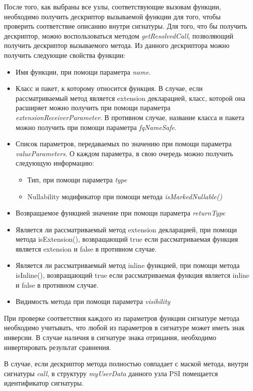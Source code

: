 После того, как выбраны все узлы, соответствующие вызовам функции, необходимо
получить дескриптор вызываемой функции для того, чтобы проверить соответствие  описанию внутри сигнатуры.
Для того, что бы получить дескриптор, можно воспользоваться методом
\textit{getResolvedCall}, позволяющий получить дескриптор вызываемого метода.
Из данного дескриптора можно получить следующие свойства функции:
\begin{itemize}
	\item Имя функции, при помощи параметра \textit{name}.
	\item Класс и пакет, к которому относится функция.
		  	В случае, если рассматриваемый метод является extension декларацией,
		  	класс, которой она расширяет можно получить при помощи параметра
		  	\textit{extensionReceiverParameter}.
		  	В противном случае, название класса и пакета можно получить при помощи параметра \textit{fqNameSafe}.
	\item Список параметров, передаваемых по значению при помощи параметра
		 	  \textit{valueParameters}.
				О каждом параметра, в свою очередь можно получить следующую информацию:
	\begin{itemize}
		\item Тип, при помощи параметра \textit{type}
		\item Nullability модификатор при помощи метода \textit{isMarkedNullable()}
	\end{itemize}
	\item Возвращаемое функцией значение при помощи параметра \textit{returnType}
	\item Является ли рассматриваемый метод extension декларацией, при помощи
				метода isExtension(), возвращающий true если рассматриваемая
				функция является extension и false в противном случае.
	\item Является ли рассматриваемый метод inline функцией, при помощи метода
				isInline(), возвращающий true если рассматриваемая функция
				является inline и false в противном случае.
	\item Видимость метода при помощи параметра \textit{visibility}
\end{itemize}
При проверке соответствия каждого из параметров функции сигнатуре метода необходимо учитывать, что любой из параметров в сигнатуре может иметь знак инверсии.
В случае наличия в сигнатуре знака отрицания, необходимо инвертировать результат сравнения.

В случае, если дескриптор метода полностью совпадает с маской метода, внутри
сигнатуры \textit{call}, в структуру \textit{myUserData} данного узла PSI
помещается идентификатор сигнатуры.
